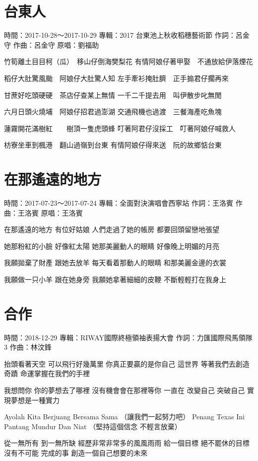 \documentclass[UTF8,a4paper,oneside,twocolumn,12pt]{ctexbook}
\newcommand{\infopair}[2]{\textbullet #1：#2}
\newcommand{\zc}[1][伍佰]{\infopair{作詞}{#1}}
\newcommand{\zq}[1][伍佰]{\infopair{作曲}{#1}}
\newcommand{\zj}[1]{\infopair{專輯}{#1}}
\newcommand{\yc}[1]{\infopair{原唱}{#1}}
\newcommand{\sj}[1]{\infopair{時間}{#1}}
\newenvironment{info}{\begin{flushleft}\kaishu
	}
	{\end{flushleft}\normalsize\yahei\par}
\newenvironment{lyric}{
	}
{}
\begin{document}
\section{台東人}
\begin{info}
	\sj{2017-10-28～2017-10-29}
	\zj{2017 台東池上秋收稻穗藝術節}
	\zc[呂金守]
	\zq[呂金守]
	\yc{劉福助}
\end{info}
\begin{lyric}
	竹筍離土目目柯（瓜）　移山仔倒海樊梨花
	有情阿娘仔著甲娶　不通放給伊落煙花

	稻仔大肚驚風颱　阿娘仔大肚驚人知
	左手牽衫掩肚臍　正手搧君仔擱再來

	甘蔗好吃頭硬硬　茶店仔查某上無情
	一千二千提去用　叫伊散步叱無閒

	六月日頭火燒埔　阿娘仔招君過澎湖
	交通飛機也過渡　三餐海產吃魚塊

	蓮霧開花滿樹紅　　樹頂一隻虎頭蜂
	叮著阿君仔沒採工　叮著阿娘仔喊救人

	枋寮坐車到楓港　翻山過嶺到台東
	有情阿娘仔得來送　阮的故鄉惦台東
\end{lyric}

\section{在那遙遠的地方}%
\begin{info}
	\sj{2017-07-23～2017-07-24}
	\zj{全面對決演唱會西寧站}
	\zc[王洛賓]
	\zq[王洛賓]
	\yc{王洛賓}
\end{info}
\begin{lyric}%
	在那遙遠的地方 有位好姑娘
	人們走過了她的帳房 都要回頭留戀地張望

	她那粉紅的小臉 好像紅太陽
	她那美麗動人的眼睛 好像晚上明媚的月亮

	我願拋棄了財產 跟她去放羊
	每天看着那動人的眼睛 和那美麗金邊的衣裳

	我願做一只小羊 跟在她身旁
	我願她拿著細細的皮鞭 不斷輕輕打在我身上
\end{lyric}

\section{合作}%
\begin{info}
	\sj{2018-12-29}
	\zj{RIWAY國際終極領袖表揚大會}
	\zc[力匯國際飛馬領隊3]
	\zq[林汶鋒]
\end{info}
\begin{lyric}
	抬頭看著天空 可以飛行好幾萬里
	你真正要贏的是你自己
	這世界 等著我們去創造奇蹟
	命運掌握在我們的手裡

	我想問你 你的夢想去了哪裡
	沒有機會會在那裡等你
	一直在 改變自己 突破自己
	實現夢想是一種實力

	Ayolah Kita Berjuang Bersama Sama
	（讓我們一起努力吧）
	Penang Texas Ini Pantang Mundur Dan Niat
	（堅持這個信念 不輕言放棄）

	從一無所有 到一無所缺
	經歷非常非常多的風風雨雨
	給一個目標 絕不罷休的目標
	沒有不可能 完成的事
	創造一個自己想要的未來
\end{lyric}
\end{document}
